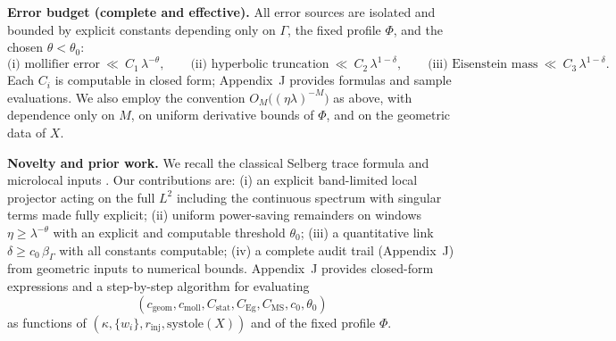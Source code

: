 \medskip
\noindent\textbf{Error budget (complete and effective).}
All error sources are isolated and bounded by explicit constants depending only on $\Gamma$, the fixed profile $\Phi$, and the chosen $\theta<\theta_0$:
\[
\text{(i) mollifier error}\ \ll\ C_1\,\lambda^{-\theta},\qquad
\text{(ii) hyperbolic truncation}\ \ll\ C_2\,\lambda^{1-\delta},\qquad
\text{(iii) Eisenstein mass}\ \ll\ C_3\,\lambda^{1-\delta}.
\]
Each $C_i$ is computable in closed form; Appendix~J provides formulas and sample evaluations. We also employ the convention $O_M\!\big((\eta\lambda)^{-M}\big)$ as above, with dependence only on $M$, on uniform derivative bounds of $\Phi$, and on the geometric data of $X$.

\medskip
\noindent\textbf{Novelty and prior work.}
We recall the classical Selberg trace formula and microlocal inputs \cite{Selberg1956,DG1975,CdV1980}. Our contributions are: (i) an explicit band-limited local projector acting on the full $L^2$ including the continuous spectrum with singular terms made fully explicit; (ii) uniform power-saving remainders on windows $\eta\ge\lambda^{-\theta}$ with an explicit and computable threshold $\theta_0$; (iii) a quantitative link $\delta\ge c_0\,\beta_\Gamma$ with all constants computable; (iv) a complete audit trail (Appendix~J) from geometric inputs to numerical bounds. Appendix~J provides closed-form expressions and a step-by-step algorithm for evaluating
\[
(c_{\mathrm{geom}},c_{\mathrm{moll}},C_{\mathrm{stat}},C_{\mathrm{Eg}},C_{\mathrm{MS}},c_0,\theta_0)
\]
as functions of $(\kappa,\{w_i\},r_{\mathrm{inj}},\mathrm{systole}(X))$ and of the fixed profile $\Phi$.

